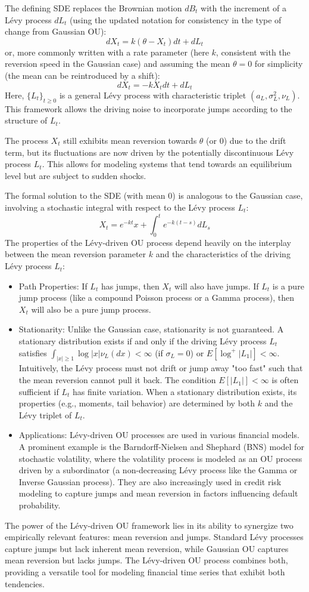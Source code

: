 \documentclass[11pt,twoside,openright]{report}
\begin{document}
The defining SDE replaces the Brownian motion $dB_t$ with the increment of a Lévy process $dL_t$ (using the updated notation for consistency in the type of change from Gaussian OU):
\[ dX_t = k (\theta - X_t) dt + dL_t \]
or, more commonly written with a rate parameter (here $k$, consistent with the reversion speed in the Gaussian case) and assuming the mean $\theta = 0$ for simplicity (the mean can be reintroduced by a shift):
\[ dX_t = -k X_t dt + dL_t \]
Here, $\{L_t\}_{t \ge 0}$ is a general Lévy process with characteristic triplet $(a_L, \sigma_L^2, \nu_L)$. This framework allows the driving noise to incorporate jumps according to the structure of $L_t$.

The process $X_t$ still exhibits mean reversion towards $\theta$ (or 0) due to the drift term, but its fluctuations are now driven by the potentially discontinuous Lévy process $L_t$. This allows for modeling systems that tend towards an equilibrium level but are subject to sudden shocks.

The formal solution to the SDE (with mean 0) is analogous to the Gaussian case, involving a stochastic integral with respect to the Lévy process $L_t$:
\[ X_t = e^{-k t} x + \int_0^t e^{-k(t-s)} dL_s \]
The properties of the Lévy-driven OU process depend heavily on the interplay between the mean reversion parameter $k$ and the characteristics of the driving Lévy process $L_t$:
\begin{itemize}
    \item Path Properties: If $L_t$ has jumps, then $X_t$ will also have jumps. If $L_t$ is a pure jump process (like a compound Poisson process or a Gamma process), then $X_t$ will also be a pure jump process.
    \item Stationarity: Unlike the Gaussian case, stationarity is not guaranteed. A stationary distribution exists if and only if the driving Lévy process $L_t$ satisfies $\int_{|x| \ge 1} \log |x| \nu_L(dx) < \infty$ (if $\sigma_L = 0$) or $E[\log^+ |L_1|] < \infty$. Intuitively, the Lévy process must not drift or jump away "too fast" such that the mean reversion cannot pull it back. The condition $E[|L_1|] < \infty$ is often sufficient if $L_t$ has finite variation. When a stationary distribution exists, its properties (e.g., moments, tail behavior) are determined by both $k$ and the Lévy triplet of $L_t$.
    \item Applications: Lévy-driven OU processes are used in various financial models. A prominent example is the Barndorff-Nielsen and Shephard (BNS) model for stochastic volatility, where the volatility process is modeled as an OU process driven by a subordinator (a non-decreasing Lévy process like the Gamma or Inverse Gaussian process). They are also increasingly used in credit risk modeling to capture jumps and mean reversion in factors influencing default probability.
\end{itemize}
The power of the Lévy-driven OU framework lies in its ability to synergize two empirically relevant features: mean reversion and jumps. Standard Lévy processes capture jumps but lack inherent mean reversion, while Gaussian OU captures mean reversion but lacks jumps. The Lévy-driven OU process combines both, providing a versatile tool for modeling financial time series that exhibit both tendencies.
\end{document}
